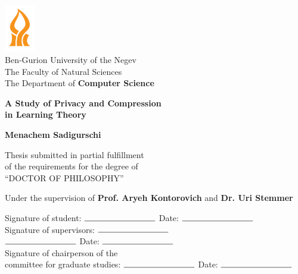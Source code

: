 \begin{titlepage}
    \begin{center}
        
        \includegraphics[width=0.1\textwidth]{bgu}\\
        Ben-Gurion University of the Negev\\
        The Faculty of Natural Sciences\\
        The Department of \textbf{Computer Science}
        
        \vspace{2cm}
        
        {\Large \textbf{A Study of Privacy and Compression \\ in Learning Theory}}
        
        \vspace{1.5cm}
        
        \textbf{Menachem Sadigurschi}
        
        \vspace{1cm}
        
        Thesis submitted in partial fulfillment\\
        of the requirements for the degree of\\
        ``DOCTOR OF PHILOSOPHY''
        
        \vspace{1cm}
        
        Under the supervision of \textbf{Prof. Aryeh Kontorovich} and \textbf{Dr. Uri Stemmer}
        
        \vspace{1cm}
        
        \begin{flushleft}
        Signature of student: \hspace{1.7cm} \( \rule{3cm}{0.15mm} \) \hfill Date: \( \rule{3cm}{0.15mm} \)\\
        Signature of supervisors: \hspace{1.05cm} \( \rule{3cm}{0.15mm} \) \\ \hspace{5.75cm} \( \rule{3cm}{0.15mm} \) \hfill Date: \( \rule{3cm}{0.15mm} \)\\
        Signature of chairperson of the\\committee for graduate studies: \( \rule{3cm}{0.15mm} \) \hfill Date: \( \rule{3cm}{0.15mm} \)
        \end{flushleft}
        
        \vfill
        
        \textbf{\subdate}
    \end{center}
\end{titlepage}
